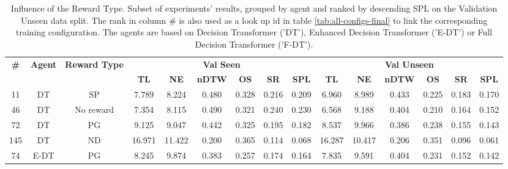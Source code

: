 \begin{table}
\centering
\caption{\label{tab:reward_type}Influence of the Reward Type. Subset of experiments' results, grouped by agent and ranked by descending SPL on the Validation Unseen data split. The rank in column \# is also used as a look up id in table \ref{tab:all-configs-final} to link the corresponding training configuration.     \newline The agents are based on Decision Transformer ('DT'), Enhanced Decision Transformer ('E-DT') or Full Decision Transformer ('F-DT').}
\begin{tabular}{@{\hskip3pt}c@{\hskip3pt}c@{\hskip3pt}c@{\hskip3pt}c@{\hskip3pt}c@{\hskip3pt}c@{\hskip3pt}c@{\hskip3pt}c@{\hskip3pt}c@{\hskip3pt}c@{\hskip3pt}c@{\hskip3pt}c@{\hskip3pt}c@{\hskip3pt}c@{\hskip3pt}c}
\toprule
\textbf{\#} & \textbf{Agent} & \textbf{Reward Type} & \multicolumn{6}{c}{\textbf{Val Seen}} & \multicolumn{6}{c}{\textbf{Val Unseen}} \\
\cmidrule(l){4-9} \cmidrule(l){10-15} \textbf{~} &     \textbf{~} &           \textbf{~} &       \textbf{TL} & \textbf{NE} & \textbf{nDTW} & \textbf{OS} & \textbf{SR} & \textbf{SPL} &         \textbf{TL} & \textbf{NE} & \textbf{nDTW} & \textbf{OS} & \textbf{SR} & \textbf{SPL} \\
\midrule
         11 &             DT &                   SP &             7.789 &       8.224 &         0.480 &       0.328 &       0.216 &        0.209 &               6.960 &       8.989 &         0.433 &       0.225 &       0.183 &        0.170 \\
         46 &             DT &            No reward &             7.354 &       8.115 &         0.490 &       0.321 &       0.240 &        0.230 &               6.568 &       9.188 &         0.404 &       0.210 &       0.164 &        0.152 \\
         72 &             DT &                   PG &             9.125 &       9.047 &         0.442 &       0.325 &       0.195 &        0.182 &               8.537 &       9.966 &         0.386 &       0.238 &       0.155 &        0.143 \\
        145 &             DT &                   ND &            16.971 &      11.422 &         0.200 &       0.365 &       0.114 &        0.068 &              16.287 &      10.417 &         0.206 &       0.351 &       0.096 &        0.061 \\
         74 &           E-DT &                   PG &             8.245 &       9.874 &         0.383 &       0.257 &       0.174 &        0.164 &               7.835 &       9.591 &         0.404 &       0.231 &       0.152 &        0.142 \\

\end{tabular}
\end{table}
